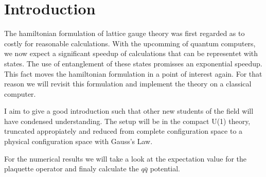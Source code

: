 \section{Introduction}
The hamiltonian formulation of lattice gauge theory was first regarded as to costly for reasonable calculations. With the upcomming of quantum computers, we now expect a significant speedup of calculations that can be representet with states. The use of entanglement of these states promisses an exponential speedup. This fact moves the hamiltonian formulation in a point of interest again. For that reason we will revisit this formulation and implement the theory on a classical computer.

I aim to give a good introduction such that other new students of the field will have condensed understanding. The setup will be in the compact U(1) theory, truncated appropiately and reduced from complete configuration space to a physical configuration space with Gauss's Law.

For the numerical results we will take a look at the expectation value for the plaquette operator and finaly calculate the $q\bar{q}$ potential.

